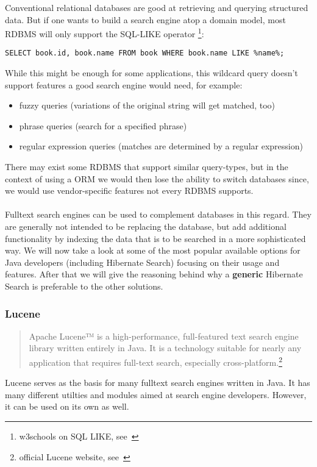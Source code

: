 Conventional relational databases are good at retrieving and querying structured data. But if one wants to build a search engine atop a domain model, most RDBMS will only support the SQL-LIKE operator \footnote{w3schools on SQL LIKE, see~\cite{sql_like_w3schools}}:\\

\lstset{language=sql}
\begin{lstlisting}[frame=htrbl, caption={SQL LIKE operator in use}, label={lst:result2}]
SELECT book.id, book.name FROM book WHERE book.name LIKE %name%;
\end{lstlisting}
While this might be enough for some applications, this wildcard query doesn't support features a good search engine would need, for example:

\begin{itemize}
	\item fuzzy queries (variations of the original string will get matched, too)
	\item phrase queries (search for a specified phrase)
	\item regular expression queries (matches are determined by a regular expression)
\end{itemize}
There may exist some RDBMS that support similar query-types, but in the context of using a ORM we would then lose the ability to switch databases since, we would use vendor-specific features not every RDBMS supports.
\\\\
Fulltext search engines can be used to complement databases in this regard. They are generally not intended to be replacing the database, but add additional functionality by indexing the data that is to be searched in a more sophisticated way. We will now take a look at some of the most popular available options for Java developers (including Hibernate Search) focusing on their usage and features. After that we will give the reasoning behind why a \textbf{generic} Hibernate Search is preferable to the other solutions.

\pagebreak

\subsubsection{Lucene}

\begin{quote}
	Apache Lucene™ is a high-performance, full-featured text search engine library written entirely in Java. It is a technology suitable for nearly any application that requires full-text search, especially cross-platform.\footnote{official Lucene website, see~\cite{lucene_apache_org}}
\end{quote}
Lucene serves as the basis for many fulltext search engines written in Java. It has many different utilties and modules aimed at search engine developers. However, it can be used on its own as well.

